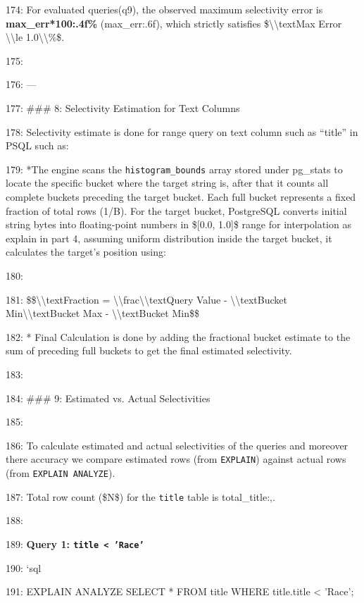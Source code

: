 \documentclass[11pt,a4paper]{article}
\begin{document}
{174: For evaluated queries(q9), the observed maximum selectivity error is \textbf{{max\_err*100:.4f}\%} ({max\_err:.6f}), which strictly satisfies \$\textbackslash{}\textbackslash{}text{{Max Error}} \textbackslash{}\textbackslash{}le 1.0\textbackslash{}\textbackslash{}\%\$.

175:

176: ---

177: \#\#\# 8: Selectivity Estimation for Text Columns

178: Selectivity estimate is done for range query on text column such as “title” in PSQL such as:

179: *The engine scans the \texttt{histogram\_bounds} array stored under pg\_stats to locate the specific bucket where the target string  is, after that it counts all complete buckets preceding the target bucket. Each full bucket represents a fixed fraction of total rows (1/B). For the target bucket, PostgreSQL converts initial string bytes into floating-point numbers in \$[0.0, 1.0]\$ range for interpolation as explain in part 4,  assuming uniform distribution inside the target bucket, it calculates the target's position using:

180:

181: \$\$\textbackslash{}\textbackslash{}text{{Fraction}} = \textbackslash{}\textbackslash{}frac{{\textbackslash{}\textbackslash{}text{{Query Value}} - \textbackslash{}\textbackslash{}text{{Bucket Min}}}}{{\textbackslash{}\textbackslash{}text{{Bucket Max}} - \textbackslash{}\textbackslash{}text{{Bucket Min}}}}\$\$

182: *   Final Calculation is done by adding the fractional bucket estimate to the sum of preceding full buckets to get the final estimated selectivity.

183:

184: \#\#\# 9: Estimated vs. Actual Selectivities

185:

186: To calculate estimated and actual selectivities of the queries and moreover there accuracy we compare estimated rows (from \texttt{EXPLAIN}) against actual rows (from \texttt{EXPLAIN ANALYZE}).

187: Total row count (\$N\$) for the \texttt{title} table is {total\_title:,}.

188:

189: \textbf{Query 1: \texttt{title < 'Race'}}

190: \texttt{}`sql

191: EXPLAIN ANALYZE SELECT * FROM title WHERE title.title < 'Race';

}
\end{document}

